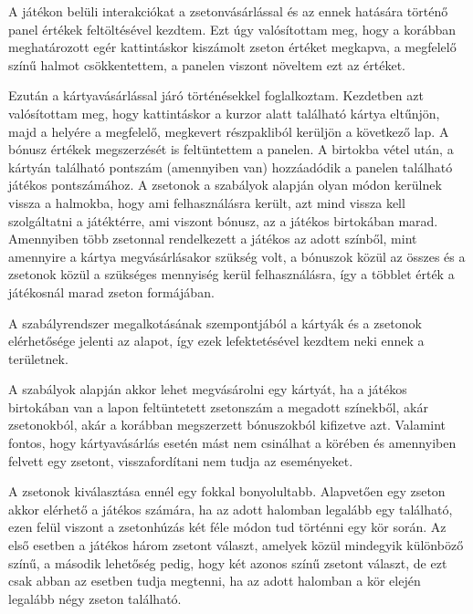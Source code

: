 
A játékon belüli interakciókat a zsetonvásárlással és az ennek hatására történő panel értékek feltöltésével kezdtem. Ezt úgy valósítottam meg, hogy a korábban meghatározott egér kattintáskor kiszámolt zseton értéket megkapva, a megfelelő színű halmot csökkentettem, a panelen viszont növeltem ezt az értéket.

Ezután a kártyavásárlással járó történésekkel foglalkoztam. Kezdetben azt valósítottam meg, hogy kattintáskor a kurzor alatt található kártya eltűnjön, majd a helyére a megfelelő, megkevert részpakliból kerüljön a következő lap. A bónusz értékek megszerzését is feltüntettem a panelen. A birtokba vétel után, a kártyán található pontszám (amennyiben van) hozzáadódik a panelen található játékos pontszámához. A zsetonok a szabályok alapján olyan módon kerülnek vissza a halmokba, hogy ami felhasználásra került, azt mind vissza kell szolgáltatni a játéktérre, ami viszont bónusz, az a játékos birtokában marad. Amennyiben több zsetonnal rendelkezett a játékos az adott színből, mint amennyire a kártya megvásárlásakor szükség volt, a bónuszok közül az összes és a zsetonok közül a szükséges mennyiség kerül felhasználásra, így a többlet érték a játékosnál marad zseton formájában.



A szabályrendszer megalkotásának szempontjából a kártyák és a zsetonok elérhetősége jelenti az alapot, így ezek  lefektetésével kezdtem neki ennek a területnek.

A szabályok alapján akkor lehet megvásárolni egy kártyát, ha a játékos birtokában van a lapon feltüntetett zsetonszám a megadott színekből, akár zsetonokból, akár a korábban megszerzett bónuszokból kifizetve azt. Valamint fontos, hogy kártyavásárlás esetén mást nem csinálhat a körében és amennyiben felvett egy zsetont, visszafordítani nem tudja az eseményeket.

A zsetonok kiválasztása ennél egy fokkal bonyolultabb. Alapvetően egy zseton akkor elérhető a játékos számára, ha az adott halomban legalább egy található, ezen felül viszont a zsetonhúzás két féle módon tud történni egy kör során. Az első esetben a játékos három zsetont választ, amelyek közül mindegyik különböző színű, a második lehetőség pedig, hogy két azonos színű zsetont választ, de ezt csak abban az esetben tudja megtenni, ha az adott halomban a kör elején legalább négy zseton található.


